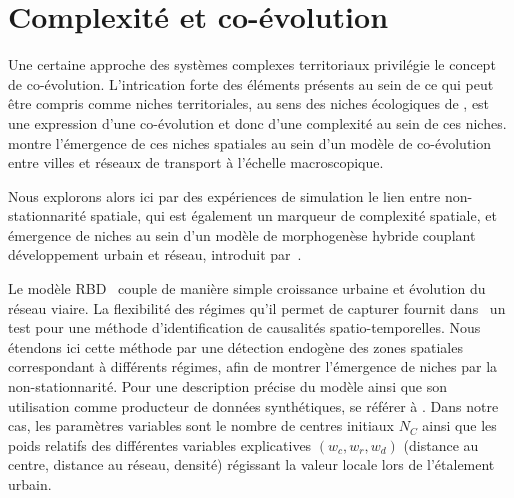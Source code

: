 \documentclass[11pt]{article}
\begin{document}



\section{Complexité et co-évolution}



Une certaine approche des systèmes complexes territoriaux privilégie le concept de co-évolution. L'intrication forte des éléments présents au sein de ce qui peut être compris comme niches territoriales, au sens des niches écologiques de \cite{holland2012signals}, est une expression d'une co-évolution et donc d'une complexité au sein de ces niches. \cite{raimbault2018modeling} montre l'émergence de ces niches spatiales au sein d'un modèle de co-évolution entre villes et réseaux de transport à l'échelle macroscopique.


Nous explorons alors ici par des expériences de simulation le lien entre non-stationnarité spatiale, qui est également un marqueur de complexité spatiale, et émergence de niches au sein d'un modèle de morphogenèse hybride couplant développement urbain et réseau, introduit par~\cite{raimbault2014hybrid}.

Le modèle RBD~\citep{raimbault2014hybrid} couple de manière simple croissance urbaine et évolution du réseau viaire. La flexibilité des régimes qu'il permet de capturer fournit dans~\cite{raimbault2017identification} un test pour une méthode d'identification de causalités spatio-temporelles. Nous étendons ici cette méthode par une détection endogène des zones spatiales correspondant à différents régimes, afin de montrer l'émergence de niches par la non-stationnarité. Pour une description précise du modèle ainsi que son utilisation comme producteur de données synthétiques, se référer à \cite{raimbault2018caracterisation}. Dans notre cas, les paramètres variables sont le nombre de centres initiaux $N_C$ ainsi que les poids relatifs des différentes variables explicatives $(w_c,w_r,w_d)$ (distance au centre, distance au réseau, densité) régissant la valeur locale lors de l'étalement urbain.
\end{document}
